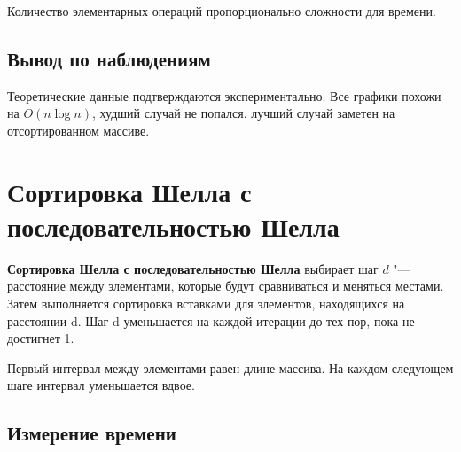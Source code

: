 \documentclass[11pt]{article}
\begin{document}
\begin{center}
\end{center}
{ \hspace*{\fill} }

\begin{center}
\end{center}
{ \hspace*{\fill} }

Количество элементарных операций пропорционально сложности для времени.

\subsection{Вывод по наблюдениям}

Теоретические данные подтверждаются экспериментально. Все графики похожи на $O(n\log n)$,
худший случай не попался. лучший случай заметен на отсортированном массиве.

\newpage

\setcounter{section}{13}
\section*{\centering Сортировка Шелла с последовательностью Шелла}

\textbf{Сортировка Шелла с последовательностью Шелла} выбирает шаг $d$ "--- расстояние между элементами, которые
будут сравниваться и меняться местами. Затем выполняется сортировка вставками для элементов,
находящихся на расстоянии d. Шаг d уменьшается на каждой итерации до тех пор, пока не достигнет 1.

Первый интервал между элементами равен длине массива. На каждом
следующем шаге интервал уменьшается вдвое.

\setcounter{subsection}{0}
\subsection{Измерение времени}

\begin{center}
\end{center}
{ \hspace*{\fill} }
\end{document}
